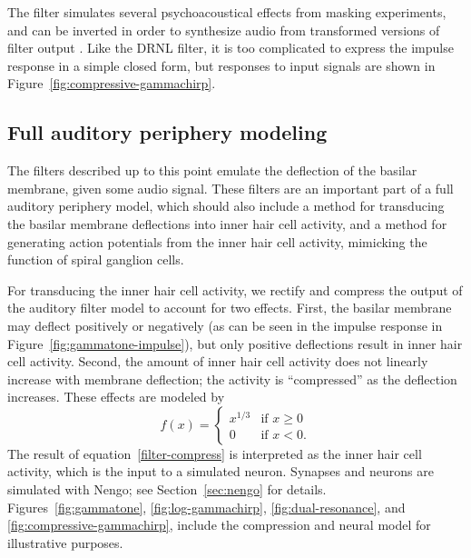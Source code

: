 The filter simulates
several psychoacoustical effects
from masking experiments,
and can be inverted in order to
synthesize audio
from transformed versions
of filter output
\citep{irino2006}.
Like the DRNL filter, it is too complicated
to express the impulse response
in a simple closed form,
but responses to input signals
are shown in Figure~\ref{fig:compressive-gammachirp}.


\subsection{Full auditory periphery modeling}

The filters described up to this point
emulate the deflection
of the basilar membrane,
given some audio signal.
These filters are an important part
of a full auditory periphery model,
which should also include
a method for transducing
the basilar membrane deflections
into inner hair cell activity,
and a method for generating
action potentials from the inner hair cell activity,
mimicking the function of spiral ganglion cells.

For transducing the inner hair cell activity,
we rectify and compress the output
of the auditory filter model
to account for two effects.
First, the basilar membrane may deflect
positively or negatively
(as can be seen in the impulse response
in Figure~\ref{fig:gammatone-impulse}),
but only positive deflections result in
inner hair cell activity.
Second, the amount of inner hair cell activity
does not linearly increase with
membrane deflection;
the activity is ``compressed''
as the deflection increases.
These effects are modeled by
\begin{equation} \label{filter-compress}
  f(x) =
  \begin{cases}
    x^{1 / 3} &\text{if } x \ge 0 \\
    0 &\text{if } x < 0.
  \end{cases}
\end{equation}
The result of equation~\eqref{filter-compress}
is interpreted as the inner hair cell activity,
which is the input to a simulated neuron.
Synapses and neurons are simulated with Nengo;
see Section~\ref{sec:nengo} for details.
Figures~\ref{fig:gammatone}, \ref{fig:log-gammachirp},
\ref{fig:dual-resonance}, and \ref{fig:compressive-gammachirp},
include the compression and neural model
for illustrative purposes.

